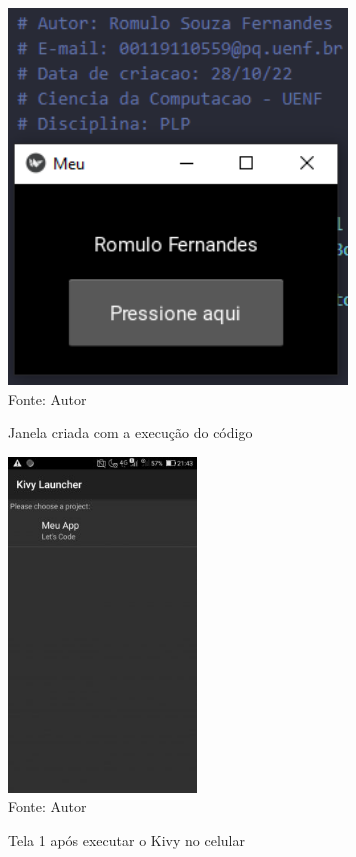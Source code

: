 		\begin{figure}[H]
		\begin{center}
			\caption{Janela criada com a execução do código} \label{ling1}
			\includegraphics[width=9cm]{mobile.PNG} \\
			{\tiny \sf Fonte:{ Autor}}
		\end{center}
		\end{figure}

\begin{figure}[H]
	\begin{center}
		\caption{Tela 1 após executar o Kivy no celular} \label{ling1}
		\includegraphics[width=5cm]{1mobile.JPG} \\
		{\tiny \sf Fonte:{ Autor}}
	\end{center}
\end{figure}

